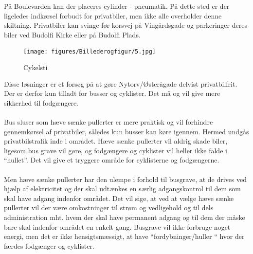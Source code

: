 På Boulevarden kan der placeres cylinder - pneumatik. På dette sted er der ligeledes indkørsel forbudt for privatbiler, men ikke alle overholder denne skiltning. Privatbiler kan svinge før korsvej på Vingårdsgade og parkeringer deres biler ved Budolfi Kirke eller på Budolfi Plads.
\begin{figure}[htbp]
  \centering
  \begin{adjustbox}{max width=\textwidth}
    \texttt{[image: figures/Billederogfigur/5.jpg]}
 \end{adjustbox}
  \caption{Cykelsti}
   \label{fig:cykelsti}
\end{figure}
Disse løsninger er et forsøg på at gøre Nytorv/Østerågade delvist privatbilfrit. Der er derfor kun tilladt for busser og cyklister. Det må og vil give mere sikkerhed til fodgængere.
~\\\\
Bus sluser som hæve sænke pullerter er mere praktisk og vil forhindre gennemkørsel af privatbiler, således kun busser kan køre igennem. Hermed undgås privatbilstrafik inde i området. Hæve sænke pullerter vil aldrig skade biler, ligesom bus grave vil gøre, og fodgængere og cyklister vil heller ikke falde i “hullet”. Det vil give et tryggere område for cyklisterne og fodgængerne.
~\\\\
Men hæve sænke pullerter har den ulempe i forhold til busgrave, at de drives ved hjælp af elektricitet og der skal udtænkes en særlig adgangskontrol til dem som skal have adgang indenfor området. Det vil sige, at ved at vælge hæve sænke pullerter vil der være omkostninger til strøm og vedligehold og til dels administration mht. hvem der skal have permanent adgang og til dem der måske bare skal indenfor området en enkelt gang. Busgrave vil ikke forbruge noget energi, men det er ikke hensigtsmæssigt, at have “fordybninger/huller “ hvor der færdes fodgænger og cyklister.
